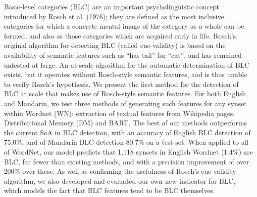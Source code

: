 Basic-level categories (BLC) are an important psycholinguistic concept introduced by Rosch et al. (1976); they are defined as the most inclusive categories for which a concrete mental image of the category as a whole can be formed, and also as those categories which are acquired early in life. Rosch's original algorithm for detecting BLC (called cue-validity) is based on the availability of semantic features such as ``has tail'' for ``cat'', and has remained untested at large. An at-scale algorithm for the automatic determination of BLC exists, but it operates without Rosch-style semantic features, and is thus unable to verify Rosch's hypothesis. We present the first method for the detection of BLC at scale that makes use of Rosch-style semantic features. For both English and Mandarin, we test three methods of generating such features for any synset within Wordnet (WN): extraction of textual features from Wikipedia pages, Distributional Memory (DM) and BART. The best of our methods outperforms the current SoA in BLC detection, with an accuracy of English BLC detection of 75.0\%, and of Mandarin BLC detection 80.7\% on a test set. When applied to all of WordNet, our model predicts that 1,118 synsets in English Wordnet (1.4\%) are BLC, far fewer than existing methods, and with a precision improvement of over 200\% over these. As well as confirming the usefulness of Rosch's cue validity algorithm, we also developed and evaluated our own new indicator for BLC, which models the fact that BLC features tend to be BLC themselves.
